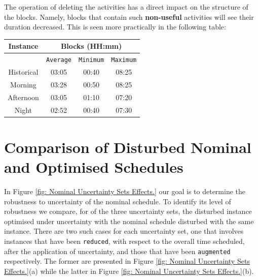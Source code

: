 \vspace{\baselineskip}
\noindent
The operation of deleting the activities has a direct impact on the structure of the blocks. Namely, blocks that contain such \textbf{non-useful} activities will see their duration decreased. This is seen more practically in the following table:


\begin{table}[ht]
\small
    \centering 
    \begin{tabular}{|c|c|c|c|}
        \hline
        \textbf{Instance} & \multicolumn{3}{|c|}{ \textbf{Blocks (HH:mm)}}  \\
        \hline
         & \texttt{Average} &  \texttt{Minimum} & \texttt{Maximum} \\
        \hline
        Historical & 03:05 & 00:40 & 08:25 \\
        \hline
        Morning & 03:28 & 00:50 & 08:25 \\
        \hline
        Afternoon & 03:05 & 01:10 & 07:20 \\
        \hline
        Night & 02:52 & 00:40 & 07:30 \\
        \hline
    \end{tabular}%
    \medbreak
\end{table}


\section{Comparison of Disturbed Nominal and Optimised Schedules}
\label{subsection: Appendix Comparison of Disturbed Nominal and Optimised Schedules}
In Figure \ref{fig: Nominal Uncertainty Sets Effects.} our goal is to determine the robustness to uncertainty of the nominal schedule. To identify its level of robustness we compare, for of the three uncertainty sets, the disturbed instance optimised under uncertainty with the nominal schedule disturbed with the same instance. There are two such cases for each uncertainty set, one that involves instances that have been \texttt{reduced}, with respect to the overall time scheduled, after the application of uncertainty, and those that have been \texttt{augmented} respectively. The former are presented in Figure \ref{fig: Nominal Uncertainty Sets Effects.}(a) while the latter in Figure \ref{fig: Nominal Uncertainty Sets Effects.}(b). 

